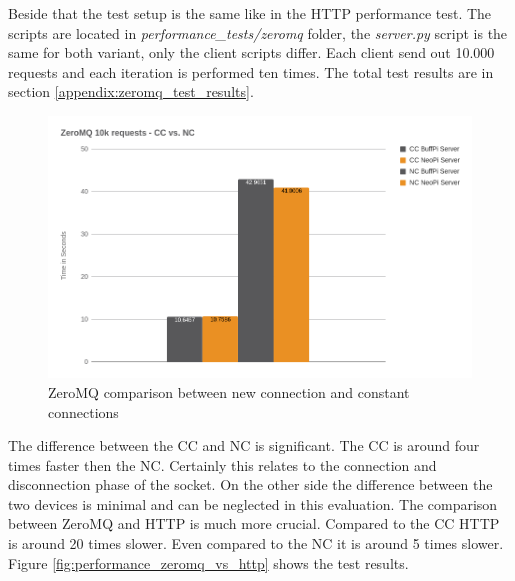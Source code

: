 Beside that the test setup is the same like in the \ac{HTTP} performance test.
The scripts are located in \textit{performance\_tests/zeromq} folder, the \textit{server.py} script is the same for both variant, only the client scripts differ.
Each client send out 10.000 requests and each iteration is performed ten times.
The total test results are in section \ref{appendix:zeromq_test_results}.

\begin{figure}[H]
    \centering
    \includegraphics[width=\textwidth]{resources/images/performance_zeromq_cc_vs_nc.png}
    \caption[ZeroMQ comparison between new connection and constant connections]{ZeroMQ comparison between new connection and constant connections}
    \label{fig:performance_zeromq_cc_vs_nc}
\end{figure}

The difference between the \ac{CC} and \ac{NC} is significant.
The \ac{CC} is around four times faster then the \ac{NC}.
Certainly this relates to the connection and disconnection phase of the socket.
On the other side the difference between the two devices is minimal and can be neglected in this evaluation.
The comparison between ZeroMQ and \ac{HTTP} is much more crucial.
Compared to the \ac{CC} \ac{HTTP} is around 20 times slower.
Even compared to the \ac{NC} it is around 5 times slower.
Figure \ref{fig:performance_zeromq_vs_http} shows the test results.

